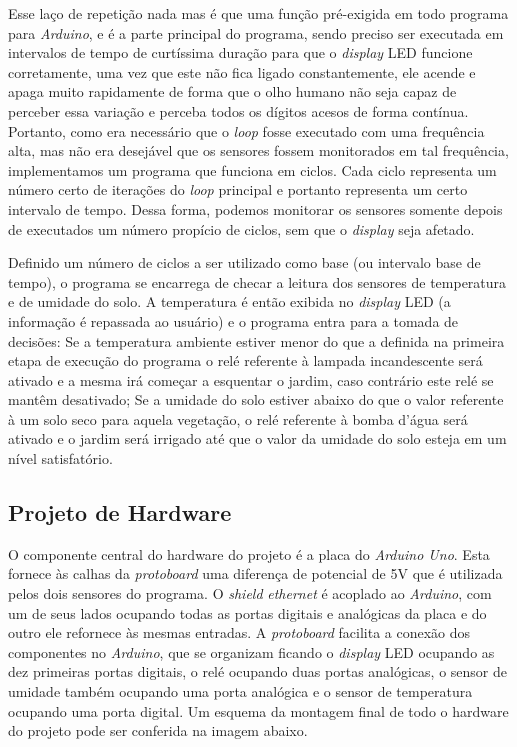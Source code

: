 \documentclass[a4paper,12pt]{article}
\begin{document}
    Esse laço de repetição nada mas é que uma função pré-exigida em todo programa para \textit{Arduino}, e é a parte principal do programa, sendo preciso ser executada em intervalos de tempo de curtíssima duração para que o \textit{display} LED funcione corretamente, uma vez que este não fica ligado constantemente, ele acende e apaga muito rapidamente de forma que o olho humano não seja capaz de perceber essa variação e perceba todos os dígitos acesos de forma contínua. Portanto, como era necessário que o \textit{loop} fosse executado com uma frequência alta, mas não era desejável que os sensores fossem monitorados em tal frequência, implementamos um programa que funciona em ciclos. Cada ciclo representa um número certo de iterações do \textit{loop} principal e portanto representa um certo intervalo de tempo. Dessa forma, podemos monitorar os sensores somente depois de executados um número propício de ciclos, sem que o \textit{display} seja afetado.

    Definido um número de ciclos a ser utilizado como base (ou intervalo base de tempo), o programa se encarrega de checar a leitura dos sensores de temperatura e de umidade do solo. A temperatura é então exibida no \textit{display} LED (a informação é repassada ao usuário) e o programa entra para a tomada de decisões: Se a temperatura ambiente estiver menor do que a definida na primeira etapa de execução do programa o relé referente à lampada incandescente será ativado e a mesma irá começar a esquentar o jardim, caso contrário este relé se mantêm desativado; Se a umidade do solo estiver abaixo do que o valor referente à um solo seco para aquela vegetação, o relé referente à bomba d’água será ativado e o jardim será irrigado até que o valor da umidade do solo esteja em um nível satisfatório.


\subsection{Projeto de Hardware}

    O componente central do hardware do projeto é a placa do \textit{Arduino Uno}. Esta fornece às calhas da \textit{protoboard} uma diferença de potencial de 5V que é utilizada pelos dois sensores do programa. O \textit{shield} \textit{ethernet} é acoplado ao \textit{Arduino}, com um de seus lados ocupando todas as portas digitais e analógicas da placa e do outro ele refornece às mesmas entradas. A \textit{protoboard} facilita a conexão dos componentes no \textit{Arduino}, que se organizam ficando o \textit{display} LED ocupando as dez primeiras portas digitais, o relé ocupando duas portas analógicas, o sensor de umidade também ocupando uma porta analógica e o sensor de temperatura ocupando uma porta digital. Um esquema da montagem final de todo o hardware do projeto pode ser conferida na imagem abaixo.
\end{document}
